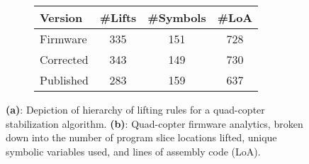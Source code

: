 \begin{figure*}
\begin{subfigure}[b]{0.49\textwidth}{}
{\begin{tikzpicture}[xscale=0.8, every node/.style={scale=0.80}]
\end{tikzpicture}
}
\caption{}
\end{subfigure}
\hfill
\begin{subfigure}[b]{0.49\textwidth}
\centering
\begin{tabular}{ |l|ccc| } 
 \hline
  Version & \#Lifts & \#Symbols & \#LoA \\ [0.5ex] 
 \hline
 \hline
  Firmware & 335 & 151 & 728 \\ [0.3ex] 
  Corrected & 343 & 149 & 730 \\ [0.3ex] 
  Published & 283 & 159 & 637 \\ [0.3ex] 
 \hline
\end{tabular}
	\caption{}
\label{fig:table-madgwick}
\end{subfigure}
\hfill
\caption{\textbf{(a)}: Depiction of hierarchy of lifting rules for a quad-copter stabilization algorithm. \textbf{(b)}: Quad-copter firmware analytics, broken down into the number of program slice locations lifted, unique symbolic variables used, and lines of assembly code (LoA).}
\label{fig:quad-analytics}
\end{figure*}

